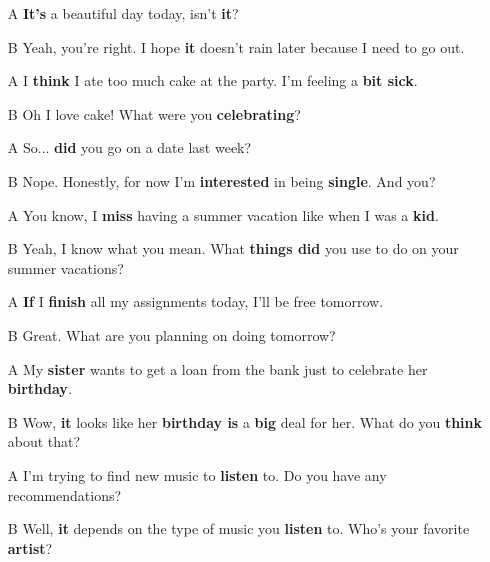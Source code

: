 \begin{itemize}
  \item[A] \textbf{It's} a beautiful day today, isn't \textbf{it}?
  \item[B] Yeah, you're right. I hope \textbf{it} doesn't rain later because I need to go out. 
\end{itemize}

\begin{itemize}
  \item[A] I \textbf{think} I ate too much cake at the party. I'm feeling a \textbf{bit sick}.
  \item[B] Oh I love cake! What were you \textbf{celebrating}? 
\end{itemize}

\begin{itemize}
  \item[A] So... \textbf{did} you go on a date last week? 
    \item[B] Nope. Honestly, for now I'm \textbf{interested} in being \textbf{single}. And you? 
\end{itemize}

\begin{itemize}
  \item[A] You know, I \textbf{miss} having a summer vacation like when I was a \textbf{kid}.
  \item[B] Yeah, I know what you mean. What \textbf{things did} you use to do on your summer vacations? 
\end{itemize}

\begin{itemize}
  \item[A] \textbf{If} I \textbf{finish} all my assignments today, I'll be free tomorrow.
  \item[B] Great. What are you planning on doing tomorrow?
\end{itemize}

\begin{itemize}
  \item[A] My \textbf{sister} wants to get a loan from the bank just to celebrate her \textbf{birthday}.
  \item[B] Wow, \textbf{it} looks like her \textbf{birthday is} a \textbf{big} deal for her. What do you \textbf{think} about that? 
\end{itemize}

\begin{itemize}
  \item[A] I'm trying to find new music to \textbf{listen} to. Do you have any recommendations?
  \item[B] Well, \textbf{it} depends on the type of music you \textbf{listen} to. Who's your favorite \textbf{artist}? 
\end{itemize}

